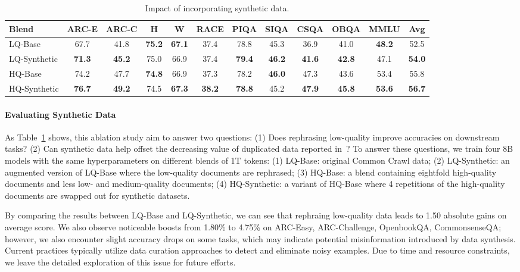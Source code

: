 \documentclass[11pt]{article}
\begin{document}
\begin{table}[!hbt]
\small
\centering
\begin{tabularx}{\textwidth}{Xccccccccccc}
\toprule
\textbf{Blend}              & \textbf{ARC-E}         & \textbf{ARC-C}         & \textbf{H}     & \textbf{W}    & \textbf{RACE}          & \textbf{PIQA}          & \textbf{SIQA}    & \textbf{CSQA} & \textbf{OBQA}    & \textbf{MMLU}          & \textbf{Avg}       \\

\midrule
LQ-Base & 67.7 & 41.8 & \textbf{75.2} & \textbf{67.1} & 37.4 & 78.8 & 45.3 & 36.9 & 41.0 & \textbf{48.2} & 52.5 \\
LQ-Synthetic & \textbf{71.3} & \textbf{45.2} & 75.0 & 66.9 & 37.4 & \textbf{79.4} & \textbf{46.2} & \textbf{41.6} & \textbf{42.8} & 47.1 & \textbf{54.0} \\
\midrule
HQ-Base  & 74.2 & 47.7 & \textbf{74.8} & 66.9 & 37.3 & 78.2 & \textbf{46.0} & 47.3 & 43.6 & 53.4 & 55.8 \\
HQ-Synthetic  & \textbf{76.7} & \textbf{49.2} & 74.5 & \textbf{67.3} & \textbf{38.2} & \textbf{78.8} & 45.2 & \textbf{47.9} & \textbf{45.8} & \textbf{53.6} & \textbf{56.7} \\
\bottomrule
\end{tabularx}
\caption{Impact of incorporating synthetic data.}
\label{table:synthetic_data_ablation}
\end{table}


\paragraph{Evaluating Synthetic Data} 
As Table~\ref{table:synthetic_data_ablation} shows, this ablation study aim to answer two questions:
(1) Does rephrasing low-quality improve accuracies on downstream tasks?
(2) Can synthetic data help offset the decreasing value of duplicated data reported in~\citep{muennighoff2024scaling}?
To answer these questions, we train four 8B models with the same hyperparameters on different blends of 1T tokens:
(1) LQ-Base: original Common Crawl data;
(2) LQ-Synthetic: an augmented version of LQ-Base where the low-quality documents are rephrased;
(3) HQ-Base: a blend containing eightfold high-quality documents and less low- and medium-quality documents;
(4) HQ-Synthetic: a variant of HQ-Base where 4 repetitions of the high-quality documents are swapped out for synthetic datasets.

By comparing the results between LQ-Base and LQ-Synthetic, we can see that rephraing low-quality data leads to 1.50 absolute gains on average score. We also observe noticeable boosts from 1.80\% to 4.75\% on ARC-Easy, ARC-Challenge, OpenbookQA, CommonsenseQA; however, we also encounter slight accuracy drops on some tasks, which may indicate potential misinformation introduced by data synthesis.
Current practices typically utilize data curation approaches to detect and eliminate noisy examples. Due to time and resource constraints, we leave the detailed exploration of this issue for future efforts.
\end{document}
